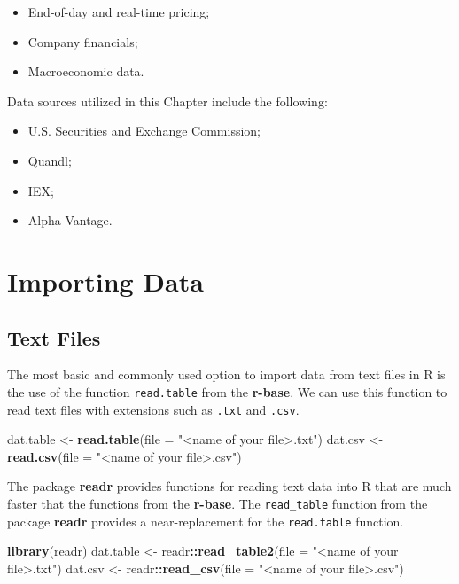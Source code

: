 \documentclass[]{book}
\newenvironment{Shaded}{\begin{snugshade}}{\end{snugshade}}
\newcommand{\KeywordTok}[1]{\textcolor[rgb]{0.13,0.29,0.53}{\textbf{#1}}}
\newcommand{\DataTypeTok}[1]{\textcolor[rgb]{0.13,0.29,0.53}{#1}}
\newcommand{\StringTok}[1]{\textcolor[rgb]{0.31,0.60,0.02}{#1}}
\newcommand{\OperatorTok}[1]{\textcolor[rgb]{0.81,0.36,0.00}{\textbf{#1}}}
\newcommand{\NormalTok}[1]{#1}
\providecommand{\tightlist}{%
  \setlength{\itemsep}{0pt}\setlength{\parskip}{0pt}}
\theoremstyle{definition}
\theoremstyle{definition}
\theoremstyle{definition}
\theoremstyle{remark}
\begin{document}
\begin{itemize}
\tightlist
\item
  End-of-day and real-time pricing;
\item
  Company financials;
\item
  Macroeconomic data.
\end{itemize}

Data sources utilized in this Chapter include the following:

\begin{itemize}
\tightlist
\item
  U.S. Securities and Exchange Commission;
\item
  Quandl;
\item
  IEX;
\item
  Alpha Vantage.
\end{itemize}

\section{Importing Data}\label{importing-data}

\subsection{Text Files}\label{text-files}

The most basic and commonly used option to import data from text files
in R is the use of the function \texttt{read.table} from the
\textbf{r-base}. We can use this function to read text files with
extensions such as \texttt{.txt} and \texttt{.csv}.

\begin{Shaded}
\begin{Highlighting}[]
\NormalTok{dat.table <-}\StringTok{ }\KeywordTok{read.table}\NormalTok{(}\DataTypeTok{file =} \StringTok{"<name of your file>.txt"}\NormalTok{)}
\NormalTok{dat.csv <-}\StringTok{ }\KeywordTok{read.csv}\NormalTok{(}\DataTypeTok{file =} \StringTok{"<name of your file>.csv"}\NormalTok{)}
\end{Highlighting}
\end{Shaded}

The package \textbf{readr} provides functions for reading text data into
R that are much faster that the functions from the \textbf{r-base}. The
\texttt{read\_table} function from the package \textbf{readr} provides a
near-replacement for the \texttt{read.table} function.

\begin{Shaded}
\begin{Highlighting}[]
\KeywordTok{library}\NormalTok{(readr)}
\NormalTok{dat.table <-}\StringTok{ }\NormalTok{readr}\OperatorTok{::}\KeywordTok{read_table2}\NormalTok{(}\DataTypeTok{file =} \StringTok{"<name of your file>.txt"}\NormalTok{)}
\NormalTok{dat.csv <-}\StringTok{ }\NormalTok{readr}\OperatorTok{::}\KeywordTok{read_csv}\NormalTok{(}\DataTypeTok{file =} \StringTok{"<name of your file>.csv"}\NormalTok{)}
\end{Highlighting}
\end{Shaded}
\end{document}
